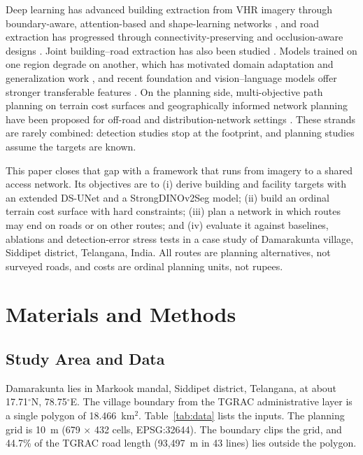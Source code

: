 Deep learning has advanced building extraction from VHR imagery through boundary-aware, attention-based and shape-learning networks \cite{li2024review,ding2022asl,li2022attraction,zhou2022bomsc,zhu2023scil}, and road extraction has progressed through connectivity-preserving and occlusion-aware designs \cite{mei2021coanet,hu2023lgnet,li2024roadcorrector,yang2024occlusion}. Joint building--road extraction has also been studied \cite{guo2024bcr}. Models trained on one region degrade on another, which has motivated domain adaptation and generalization work \cite{ma2023domain,liang2024sdg,zhang2022curriculum}, and recent foundation and vision--language models offer stronger transferable features \cite{oquab2024dinov2,xing2026clip2rs,cao2025ov}. On the planning side, multi-objective path planning on terrain cost surfaces and geographically informed network planning have been proposed for off-road and distribution-network settings \cite{zhu2025pathplan,wang2024distribution}. These strands are rarely combined: detection studies stop at the footprint, and planning studies assume the targets are known.

This paper closes that gap with a framework that runs from imagery to a shared access network. Its objectives are to (i) derive building and facility targets with an extended DS-UNet and a StrongDINOv2Seg model; (ii) build an ordinal terrain cost surface with hard constraints; (iii) plan a network in which routes may end on roads or on other routes; and (iv) evaluate it against baselines, ablations and detection-error stress tests in a case study of Damarakunta village, Siddipet district, Telangana, India. All routes are planning alternatives, not surveyed roads, and costs are ordinal planning units, not rupees.

\section{Materials and Methods}
\subsection{Study Area and Data}
Damarakunta lies in Markook mandal, Siddipet district, Telangana, at about 17.71$^\circ$N, 78.75$^\circ$E. The village boundary from the TGRAC administrative layer is a single polygon of 18.466~km$^2$. Table~\ref{tab:data} lists the inputs. The planning grid is 10~m (679 $\times$ 432 cells, EPSG:32644). The boundary clips the grid, and 44.7\% of the TGRAC road length (93,497~m in 43 lines) lies outside the polygon.

